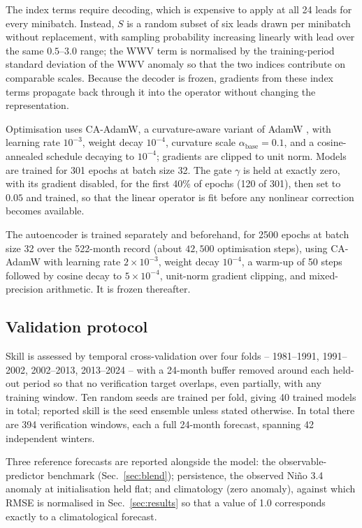 The index terms require decoding, which is expensive to apply at all 24 leads for every
minibatch. Instead, $S$ is a random subset of six leads drawn per minibatch without replacement,
with sampling probability increasing linearly with lead over the same $0.5$--$3.0$ range; the
WWV term is normalised by the training-period standard deviation of the WWV anomaly so that the
two indices contribute on comparable scales. Because the decoder is frozen, gradients from
these index terms propagate back through it into the operator without changing the
representation.

Optimisation uses CA-AdamW, a curvature-aware variant of AdamW
\citep{AnEtAl2026}, with learning rate $10^{-3}$, weight decay $10^{-4}$, curvature scale
$\alpha_{\mathrm{base}}=0.1$, and a cosine-annealed schedule decaying to $10^{-4}$; gradients
are clipped to unit norm. Models are trained for 301 epochs at batch size 32. The gate $\gamma$
is held at exactly zero, with its gradient disabled, for the first 40\% of epochs (120 of 301),
then set to $0.05$ and trained, so that the linear operator is fit before any nonlinear
correction becomes available.

The autoencoder is trained separately and beforehand, for 2500 epochs at batch size 32 over the
522-month record (about $42{,}500$ optimisation steps), using CA-AdamW with learning rate
$2\times10^{-3}$, weight decay $10^{-4}$, a warm-up of 50 steps followed by cosine decay to
$5\times10^{-4}$, unit-norm gradient clipping, and mixed-precision arithmetic. It is frozen
thereafter.

\subsection{Validation protocol}
\label{sec:validation}

Skill is assessed by temporal cross-validation over four folds -- 1981--1991, 1991--2002,
2002--2013, 2013--2024 -- with a 24-month buffer removed around each held-out period so that no
verification target overlaps, even partially, with any training window. Ten random seeds are
trained per fold, giving 40 trained models in total; reported skill is the seed ensemble unless
stated otherwise. In total there are 394 verification windows, each a full 24-month forecast,
spanning 42 independent winters.

Three reference forecasts are reported alongside the model: the observable-predictor benchmark
(Sec.~\ref{sec:blend}); persistence, the observed Ni\~no 3.4 anomaly at initialisation held
flat; and climatology (zero anomaly), against which RMSE is normalised in
Sec.~\ref{sec:results} so that a value of 1.0 corresponds exactly to a climatological forecast.

